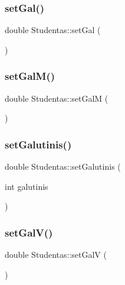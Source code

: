 \mbox{\label{class_studentas_a83b07fa9066e89f424f894d351c2d1ac}} 
\subsubsection{\texorpdfstring{setGal()}{setGal()}}
{\footnotesize\ttfamily double Studentas\+::set\+Gal (\begin{DoxyParamCaption}{ }\end{DoxyParamCaption})}

\mbox{\label{class_studentas_a2f030abae9dd890d3e422030eb85b55b}} 
\subsubsection{\texorpdfstring{setGalM()}{setGalM()}}
{\footnotesize\ttfamily double Studentas\+::set\+GalM (\begin{DoxyParamCaption}{ }\end{DoxyParamCaption})}

\mbox{\label{class_studentas_a6557c8934c2b2602cfd28680cd6c3702}} 
\subsubsection{\texorpdfstring{setGalutinis()}{setGalutinis()}}
{\footnotesize\ttfamily double Studentas\+::set\+Galutinis (\begin{DoxyParamCaption}\item[{int}]{galutinis }\end{DoxyParamCaption})}

\mbox{\label{class_studentas_adbb4c62ae2abdeafba0a08e713abd483}} 
\subsubsection{\texorpdfstring{setGalV()}{setGalV()}}
{\footnotesize\ttfamily double Studentas\+::set\+GalV (\begin{DoxyParamCaption}{ }\end{DoxyParamCaption})}

